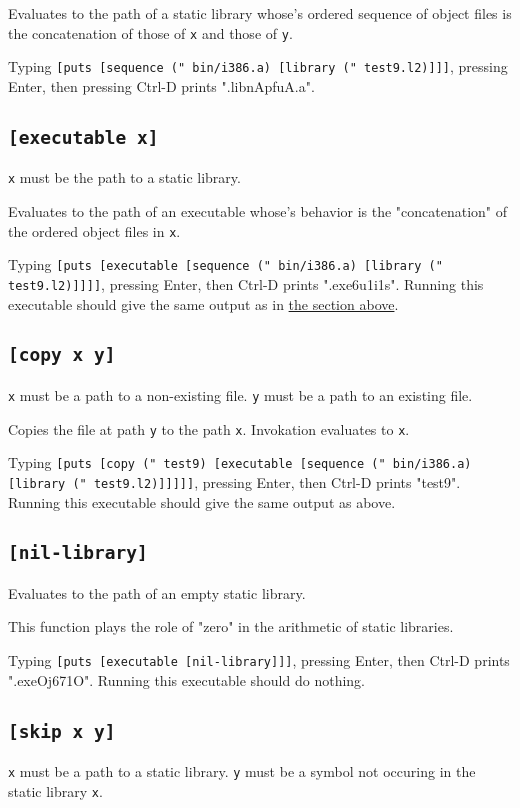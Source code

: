 \documentclass[twocolumn,landscape]{article}
\begin{document}
      Evaluates to the path of a static library whose's ordered sequence of object files is the concatenation of those of \lstinline{x} and those of \lstinline{y}.

      Typing \lstinline{[puts [sequence (" bin/i386.a) [library (" test9.l2)]]]}, pressing Enter, then pressing Ctrl-D prints ".libnApfuA.a".

    \subsection{\lstinline{[executable x]}}
      \lstinline{x} must be the path to a static library.

      Evaluates to the path of an executable whose's behavior is the "concatenation" of the ordered object files in \lstinline{x}.

      Typing \lstinline{[puts [executable [sequence (" bin/i386.a) [library (" test9.l2)]]]]}, pressing Enter, then Ctrl-D prints ".exe6u1i1s". Running this executable should give the same output as in \hyperref[sec:test9.l2]{the section above}.

    \subsection{\lstinline{[copy x y]}}
      \lstinline{x} must be a path to a non-existing file. \lstinline{y} must be a path to an existing file.

      Copies the file at path \lstinline{y} to the path \lstinline{x}. Invokation evaluates to \lstinline{x}.

      Typing \lstinline{[puts [copy (" test9) [executable [sequence (" bin/i386.a) [library (" test9.l2)]]]]]}, pressing Enter, then Ctrl-D prints "test9". Running this executable should give the same output as above.

    \subsection{\lstinline{[nil-library]}}
      Evaluates to the path of an empty static library.

      This function plays the role of "zero" in the arithmetic of static libraries.

      Typing \lstinline{[puts [executable [nil-library]]]}, pressing Enter, then Ctrl-D prints ".exeOj671O". Running this executable should do nothing.

    \subsection{\lstinline{[skip x y]}}
      \lstinline{x} must be a path to a static library. \lstinline{y} must be a symbol not occuring in the static library \lstinline{x}.
\end{document}
